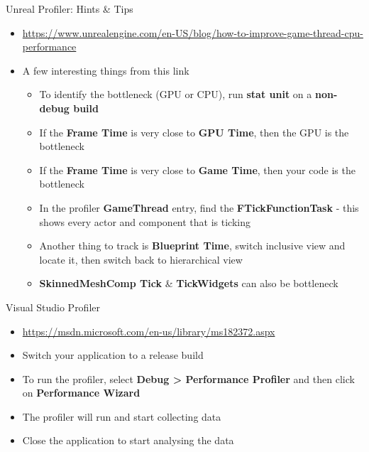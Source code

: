 \begin{frame}{Unreal Profiler: Hints \& Tips}
\begin{itemize}
	\pause \item \url{https://www.unrealengine.com/en-US/blog/how-to-improve-game-thread-cpu-performance}
	\pause \item A few interesting things from this link
	\begin{itemize}
		\pause \item To identify the bottleneck (GPU or CPU), run \textbf{stat unit} on a \textbf{non-debug build}
		\pause \item If the \textbf{Frame Time} is very close to \textbf{GPU Time}, then the GPU is the bottleneck
		\pause \item If the \textbf{Frame Time} is very close to \textbf{Game Time}, then your code is the bottleneck
		\pause \item In the profiler \textbf{GameThread} entry, find the \textbf{FTickFunctionTask} - this shows every actor and component that is ticking
		\pause \item Another thing to track is \textbf{Blueprint Time}, switch inclusive view and locate it, then switch back to hierarchical view
		\pause \item \textbf{SkinnedMeshComp Tick} \& \textbf{TickWidgets} can also be bottleneck
	\end{itemize}
\end{itemize}
\end{frame}

\begin{frame}{ Visual Studio Profiler}
\begin{itemize}
	\pause \item \url{https://msdn.microsoft.com/en-us/library/ms182372.aspx}
	\pause \item Switch your application to a release build
	\pause \item To run the profiler, select \textbf{Debug > Performance Profiler} and then click on \textbf{Performance Wizard}
	\pause \item The profiler will run and start collecting data
	\pause \item Close the application to start analysing the data
\end{itemize}
\end{frame}


